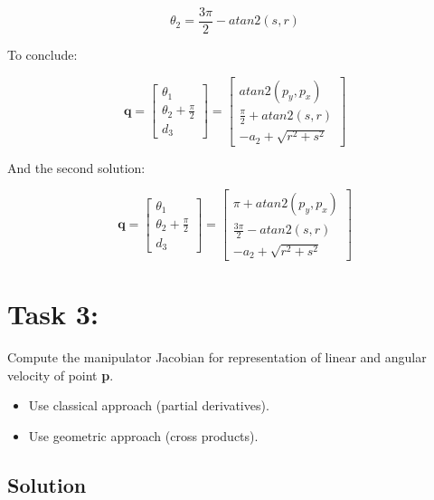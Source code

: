 \documentclass[12pt, a4paper]{report}
\begin{document}
\begin{equation}
        \theta_2 = \frac{3\pi}{2}- atan2(s, r)
\end{equation}

To conclude: 

\begin{equation}
        \bm{q} =
        \begin{bmatrix}
                \theta_1\\
               \theta_2+\frac{\pi}{2}\\
                d_3
        \end{bmatrix}
        = 
        \begin{bmatrix}
                atan2(p_y, p_x)\\
               \frac{\pi}{2}+atan2(s, r)\\
                -a_2 + \sqrt{r^2+s^2}
        \end{bmatrix}       
\end{equation}

And the second solution:

\begin{equation}
        \bm{q} =
        \begin{bmatrix}
                \theta_1\\
               \theta_2+\frac{\pi}{2}\\
                d_3
        \end{bmatrix}
        = 
        \begin{bmatrix}
                \pi + atan2(p_y, p_x)\\
              \frac{3\pi}{2} - atan2(s, r)\\
                -a_2 + \sqrt{r^2+s^2}
        \end{bmatrix}       
\end{equation}
\section*{Task 3:}
Compute the manipulator Jacobian for representation of linear and angular velocity of point \textbf{p}.
\begin{itemize}
	\item Use classical approach (partial derivatives).
\item Use geometric approach (cross products).
\end{itemize}


{\centering
\subsection*{Solution}
}
\end{document}
